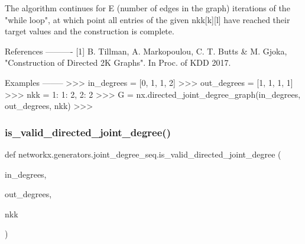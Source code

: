 \begin{DoxyVerb}
The algorithm continues for E (number of edges in the graph) iterations of
the "while loop", at which point all entries of the given nkk[k][l] have
reached their target values and the construction is complete.

References
----------
[1] B. Tillman, A. Markopoulou, C. T. Butts & M. Gjoka,
    "Construction of Directed 2K Graphs". In Proc. of KDD 2017.

Examples
--------
>>> in_degrees = [0, 1, 1, 2]
>>> out_degrees = [1, 1, 1, 1]
>>> nkk = {1: {1: 2, 2: 2}}
>>> G = nx.directed_joint_degree_graph(in_degrees, out_degrees, nkk)
>>>
\end{DoxyVerb}
 \mbox{\label{namespacenetworkx_1_1generators_1_1joint__degree__seq_abed44ed09f640e2cec94975588d74505}} 
\subsubsection{\texorpdfstring{is\+\_\+valid\+\_\+directed\+\_\+joint\+\_\+degree()}{is\_valid\_directed\_joint\_degree()}}
{\footnotesize\ttfamily def networkx.\+generators.\+joint\+\_\+degree\+\_\+seq.\+is\+\_\+valid\+\_\+directed\+\_\+joint\+\_\+degree (\begin{DoxyParamCaption}\item[{}]{in\+\_\+degrees,  }\item[{}]{out\+\_\+degrees,  }\item[{}]{nkk }\end{DoxyParamCaption})}

